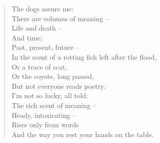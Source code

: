 \begin{verse}
  The dogs assure me:\\
  There are volumes of meaning --\\
  Life and death --\\
  And time;\\
  Past, present, future --\\
  In the scent of a rotting fish left after the flood,\\
  Or a trace of scat,\\
  Or the coyote, long passed,\\
  But not everyone reads poetry.\\

  \vspace{1pc}
  I'm not so lucky, all told:\\
  The rich scent of meaning --\\
  Heady, intoxicating --\\
  Rises only from words\\
  And the way you rest your hands on the table.
\end{verse}
